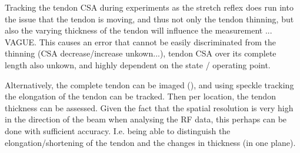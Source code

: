 Tracking the tendon CSA during experiments as the stretch reflex does run into the issue that the tendon is moving, and thus not only the tendon thinning, but also the varying thickness of the tendon will influence the measurement ... VAGUE. This causes an error that cannot be easily discriminated from the thinning (CSA decrease/increase unkown...), tendon CSA over its complete length also unkown, and highly dependent on the state / operating point.

Alternatively, the complete tendon can be imaged (), and using speckle tracking the elongation of the tendon can be tracked. Then per location, the tendon thickness can be assessed. Given the fact that the spatial resolution is very high in the direction of the beam when analysing the RF data, this perhaps can be done with sufficient accuracy. I.e. being able to distinguish the elongation/shortening of the tendon and the changes in thickness (in one plane).


